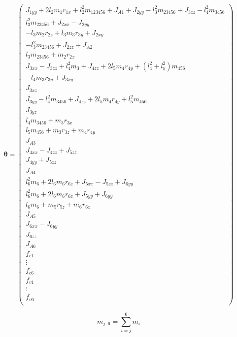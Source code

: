 {\footnotesize
\begin{equation}
\label{eq:Parametersatz}
	\boldsymbol{\theta} = 
		\begin{pmatrix}
			J_{1yy} + 2 l_2 m_1 r_{1x} + l_2^2 m_{123456} + J_{A1} + J_{2yy} - l_3^2 m_{23456} + J_{3zz} - l_4^2 m_{3456} \\
			l_3^2 m_{23456} + J_{2xx} - J_{2yy} \\
			- l_3 m_2 r_{2z} + l_3 m_3 r_{3y} + J_{2xy} \\
			- l_3^2 m_{23456} + J_{2zz} + J_{A2} \\
			l_3 m_{23456} + m_2 r_{2x} \\
			J_{3xx} -J_{3zz} + l_4^2 m_3 + J_{4zz} + 2 l_5 m_4 r_{4y} + (l_4^2 +l_5^2) m_{456} \\
			-l_4 m_3 r_{3y} + J_{3xy} \\
			J_{3xz} \\
			J_{3yy} - l_4^2 m_{3456} + J_{4zz} + 2l_5 m_4 r_{4y} + l_5^2 m_{456} \\
			J_{3yz} \\
			l_4 m_{3456} + m_3 r_{3x} \\
			l_5 m_{456} + m_3 r_{3z} + m_4 r_{4y} \\
			J_{A3} \\
			J_{4xx} - J_{4zz} + J_{5zz} \\
			J_{4yy} + J_{5zz} \\
			J_{A4} \\
			l_6^2 m_6 + 2 l_6 m_6 r_{6z} + J_{5xx} - J_{5zz} + J_{6yy} \\
			l_6^2 m_6 + 2 l_6 m_6 r_{6z} + J_{5yy} + J_{6yy} \\
			l_6 m_6 + m_5 r_{5z} + m_6 r_{6z} \\
			J_{A5} \\
			J_{6xx} - J_{6yy} \\
			J_{6zz} \\
			J_{A6} \\
			
			f_{c1} \\
			\vdots \\
			f_{c6} \\
			
			f_{v1} \\
            \vdots \\
			f_{v6} \\
		\end{pmatrix}
\end{equation}
}


\begin{equation}
\label{eq:MassenSumme}
    m_{j..6}=\sum_{i=j}^{6} m_i
\end{equation}